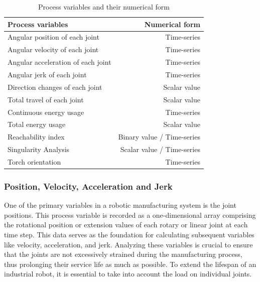 \begin{table}[H]
	\centering
	\begin{tabular}{||l|r||}
		\hline
		Process variables & Numerical form\\
		\hline
		\hline
		\hline
		Angular position of each joint & Time-series\\
		Angular velocity of each joint & Time-series\\
		Angular acceleration of each joint& Time-series\\
		Angular jerk of each joint& Time-series\\
		\hline
		\hline
		Direction changes of each joint& Scalar value\\
		Total travel of each joint& Scalar value\\
		\hline
		\hline	
		
		
		
		Continuous energy usage & Time-series\\
		Total energy usage & Scalar value\\
		\hline
		\hline
		Reachability index & Binary value / Time-series\\
		Singularity Analysis & Scalar value / Time-series\\
		Torch orientation & Time-series\\
		
		
		\hline
		\hline
		
	\end{tabular}
	
	
	\caption{Process variables and their numerical form}
	\label{procesparameters}
\end{table}

\subsubsection*{Position, Velocity, Acceleration and Jerk }
One of the primary variables in a robotic manufacturing system is the joint positions. This process variable is recorded as a one-dimensional array comprising the rotational position or extension values of each rotary or linear joint at each time step. This data serves as the foundation for calculating subsequent variables like velocity, acceleration, and jerk. Analyzing these variables is crucial to ensure that the joints are not excessively strained during the manufacturing process, thus prolonging their service life as much as possible. To extend the lifespan of an industrial robot, it is essential to take into account the load on individual joints.

